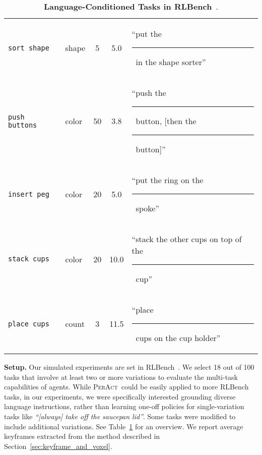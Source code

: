 \documentclass{article}
\newcommand{\secref}[1]{Section~\ref{#1}}
\newcommand{\tabref}[1]{Table~\ref{#1}}
\newcommand{\model}{\textsc{PerAct}}
\newcommand{\blank}{\rule{0.3cm}{0.25mm}~}
\begin{document}
\begin{table}[h]
\begin{tabular}{llccl}
\texttt{sort shape}       & shape                      &           5          &           5.0        & ``put the \blank in the shape sorter'' \\
\texttt{push buttons}     & color                      &          50          &           3.8        & ``push the \blank button, [then the \blank button]'' \\
\texttt{insert peg}       & color                      &          20          &           5.0        & ``put the ring on the \blank spoke'' \\
\texttt{stack cups}       & color                      &          20          &          10.0        & ``stack the other cups on top of the \blank cup'' \\
\texttt{place cups}       & count                      &           3          &          11.5        & ``place \blank cups on the cup holder'' \\
\bottomrule
\end{tabular}
\vspace{0.2cm}
\caption{\scriptsize \textbf{Language-Conditioned Tasks in RLBench}~\citep{james2020rlbench}.}
\label{table:task_desc}
\end{table} 
\textbf{Setup.} Our simulated experiments are set in  RLBench~\citep{james2020rlbench}. We select 18 out of 100 tasks that involve at least two or more variations to evaluate the multi-task capabilities of agents. While \model~could be easily applied to more RLBench tasks, in our experiments, we were specifically interested grounding diverse language instructions, rather than learning one-off policies for single-variation tasks like \textit{``[always] take off the saucepan lid''}. 
Some tasks were modified to include additional variations. 
See \tabref{table:task_desc} for an overview. We report average keyframes extracted from the method described in \secref{sec:keyframe_and_voxel}.
\end{document}
